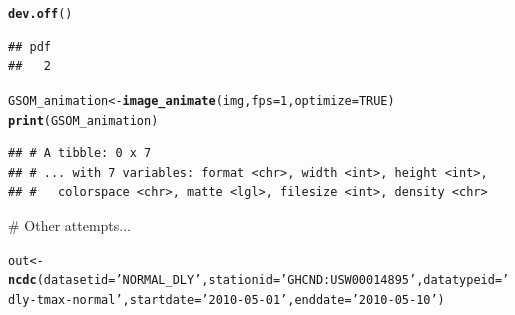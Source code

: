\documentclass{article}\usepackage[]{graphicx}\usepackage[]{color}
\makeatletter
\newcommand{\hlnum}[1]{\textcolor[rgb]{0.686,0.059,0.569}{#1}}%
\newcommand{\hlstr}[1]{\textcolor[rgb]{0.192,0.494,0.8}{#1}}%
\newcommand{\hlstd}[1]{\textcolor[rgb]{0.345,0.345,0.345}{#1}}%
\newcommand{\hlkwb}[1]{\textcolor[rgb]{0.69,0.353,0.396}{#1}}%
\newcommand{\hlkwc}[1]{\textcolor[rgb]{0.333,0.667,0.333}{#1}}%
\newcommand{\hlkwd}[1]{\textcolor[rgb]{0.737,0.353,0.396}{\textbf{#1}}}%
\newenvironment{kframe}{%
 \def\at@end@of@kframe{}%
 \ifinner\ifhmode%
  \def\at@end@of@kframe{\end{minipage}}%
  \begin{minipage}{\columnwidth}%
 \fi\fi%
 \def\FrameCommand##1{\hskip\@totalleftmargin \hskip-\fboxsep
 \colorbox{shadecolor}{##1}\hskip-\fboxsep
     \hskip-\linewidth \hskip-\@totalleftmargin \hskip\columnwidth}%
 \MakeFramed {\advance\hsize-\width
   \@totalleftmargin\z@ \linewidth\hsize
   \@setminipage}}%
 {\par\unskip\endMakeFramed%
 \at@end@of@kframe}
\newenvironment{knitrout}{}{} %
\makeatother
\begin{document}
\begin{knitrout}
\begin{kframe}
{\ttfamily\noindent\bfseries\color{errorcolor}{\#\# Error in `[.data.frame`(GSOMsub, GSOMsub\$Month == maxmonth, ): object 'maxmonth' not found}}\begin{alltt}
\hlkwd{dev.off}\hlstd{()}
\end{alltt}
\begin{verbatim}
## pdf 
##   2
\end{verbatim}
\begin{alltt}
\hlstd{GSOM_animation} \hlkwb{<-} \hlkwd{image_animate}\hlstd{(img,} \hlkwc{fps} \hlstd{=} \hlnum{1}\hlstd{,} \hlkwc{optimize} \hlstd{=} \hlnum{TRUE}\hlstd{)}
\hlkwd{print}\hlstd{(GSOM_animation)}
\end{alltt}
\begin{verbatim}
## # A tibble: 0 x 7
## # ... with 7 variables: format <chr>, width <int>, height <int>,
## #   colorspace <chr>, matte <lgl>, filesize <int>, density <chr>
\end{verbatim}
\end{kframe}
\end{knitrout}


# Other attempts...

\begin{knitrout}
\color{fgcolor}\begin{kframe}
\begin{alltt}
\hlstd{out} \hlkwb{<-} \hlkwd{ncdc}\hlstd{(}\hlkwc{datasetid}\hlstd{=}\hlstr{'NORMAL_DLY'}\hlstd{,} \hlkwc{stationid}\hlstd{=}\hlstr{'GHCND:USW00014895'}\hlstd{,} \hlkwc{datatypeid}\hlstd{=}\hlstr{'dly-tmax-normal'}\hlstd{,} \hlkwc{startdate} \hlstd{=} \hlstr{'2010-05-01'}\hlstd{,} \hlkwc{enddate} \hlstd{=} \hlstr{'2010-05-10'}\hlstd{)}
\end{alltt}
\end{kframe}
\end{knitrout}
\end{document}
